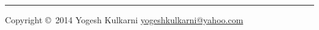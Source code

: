 % 

\usepackage{fontspec}
\setmainfont{Segoe UI}
\newfontfamily{}
\newfontfamily{}
\graphicspath{{images/}}


\raggedright
\footnotesize

\begin{multicols}{3}


\pagebreak


\rule{0.3\linewidth}{0.25pt}
\scriptsize
Copyright \copyright\ 2014 Yogesh Kulkarni
\href{http://www.yogeshkulkarni.com}{yogeshkulkarni@yahoo.com}

\end{multicols}

